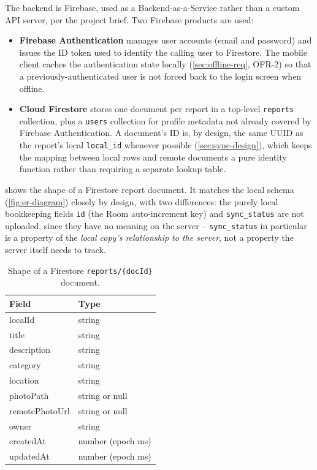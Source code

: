 The backend is Firebase, used as a Backend-as-a-Service rather than a
custom API server, per the project brief. Two Firebase products are used:

\begin{itemize}
  \item \textbf{Firebase Authentication} manages user accounts (email and
  password) and issues the ID token used to identify the calling user to
  Firestore. The mobile client caches the authentication state locally
  (\cref{sec:offline-req}, OFR-2) so that a previously-authenticated user
  is not forced back to the login screen when offline.
  \item \textbf{Cloud Firestore} stores one document per report in a
  top-level \texttt{reports} collection, plus a \texttt{users} collection
  for profile metadata not already covered by Firebase Authentication. A
  document's ID is, by design, the same UUID as the report's local
  \texttt{local\_id} whenever possible (\cref{sec:sync-design}), which
  keeps the mapping between local rows and remote documents a pure
  identity function rather than requiring a separate lookup table.
\end{itemize}

 shows the shape of a Firestore report document.
It matches the local schema (\cref{fig:er-diagram}) closely by design, with
two differences: the purely local bookkeeping fields \texttt{id} (the
Room auto-increment key) and \texttt{sync\_status} are not uploaded, since
they have no meaning on the server -- \texttt{sync\_status} in particular
is a property of the \emph{local copy's relationship to the server}, not a
property the server itself needs to track.

\begin{table}[htbp]
\centering
\caption{Shape of a Firestore \texttt{reports/\{docId\}} document.}
\label{tab:firestore-doc}
\begin{tabularx}{\textwidth}{@{}l X@{}}
\toprule
\textbf{Field} & \textbf{Type} \\
\midrule
localId & string \\
title & string \\
description & string \\
category & string \\
location & string \\
photoPath & string or null \\
remotePhotoUrl & string or null \\
owner & string \\
createdAt & number (epoch ms) \\
updatedAt & number (epoch ms) \\
\bottomrule
\end{tabularx}
\end{table}

